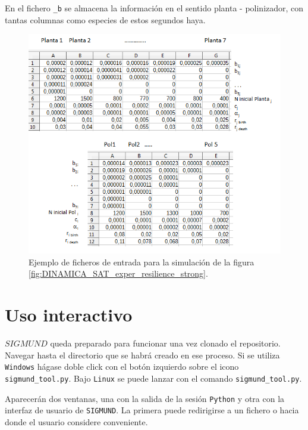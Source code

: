 En el fichero \texttt{\_b} se almacena la información en el sentido planta - polinizador, con tantas columnas como especies de estos segundos haya.

\begin{figure}[h!]
\centering
\includegraphics[scale=1]{ManFigs/matricessim.png}
\caption{Ejemplo de ficheros de entrada para la simulación de la figura \ref{fig:DINAMICA_SAT_exper_resilience_strong}.}
\label{fig:ASIGMUNDMAN_matricessim}
\end{figure}

\clearpage
\section{Uso interactivo}
\label{sec:ASIGMUNDMAN_ui}

$SIGMUND$ queda preparado para funcionar una vez clonado el repositorio. Navegar hasta el directorio  que se habrá creado en ese proceso. Si se utiliza \texttt{Windows} hágase doble click con el botón izquierdo sobre el icono \texttt{sigmund\_tool.py}. Bajo \texttt{Linux} se puede lanzar con el comando \texttt{sigmund\_tool.py}.

Aparecerán dos ventanas, una con la salida de la sesión \texttt{Python} y otra con la interfaz de usuario de \texttt{SIGMUND}. La primera puede redirigirse a un fichero o hacia donde el usuario considere conveniente.


